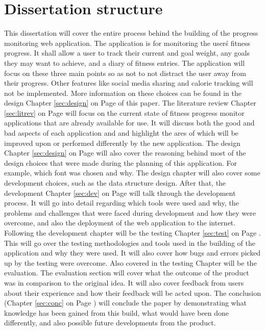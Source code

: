 \section{Dissertation structure}
This dissertation will cover the entire process behind the building of the progress monitoring web application. The application is for monitoring the user\'s fitness progress. It shall allow a user to track their current and goal weight, any goals they may want to achieve, and a diary of fitness entries. The application will focus on these three main points so as not to not distract the user away from their progress. Other features like social media sharing and calorie tracking will not be implemented. More information on these choices can be found in the design Chapter \ref{sec:design} on Page \pageref{sec:design} of this paper. The literature review Chapter \ref{sec:litrev} on Page \pageref{sec:litrev} will focus on the current state of fitness progress monitor applications that are already available for use. It will discuss both the good and bad aspects of each application and and highlight the ares of which will be improved upon or performed differently by the new application. The design Chapter \ref{sec:design} on Page \pageref{sec:design} will also cover the reasoning behind most of the design choices that were made during the planning of this application. For example, which font was chosen and why. The design chapter will also cover some development choices, such as the data structure design. After that, the development Chapter \ref{sec:dev} on Page \pageref{sec:dev} will talk through the development process. It will go into detail regarding which tools were used and why, the problems and challenges that were faced during development and how they were overcome, and also the deployment of the web application to the internet. Following the development chapter will be the testing Chapter \ref{sec:test} on Page \pageref{sec:test}. This will go over the testing methodologies and tools used in the building of the application and why they were used. It will also cover how bugs and errors picked up by the testing were overcome. Also covered in the testing Chapter will be the evaluation. The evaluation section will cover what the outcome of the product was in comparison to the original idea. It will also cover feedback from users about their experience and how their feedback will be acted upon. The conclusion (Chapter \ref{sec:conc} on Page \pageref{sec:conc}) will conclude the paper by demonstrating what knowledge has been gained from this build, what would have been done differently, and also possible future developments from the product.\\

